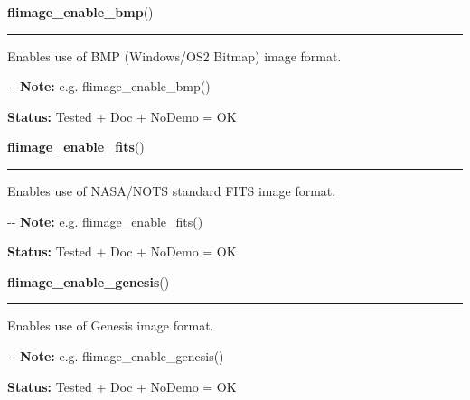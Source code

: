 \hspace{.8\funcindent}\begin{boxedminipage}{\funcwidth}

    \raggedright \textbf{flimage\_enable\_bmp}()

    \vspace{-1.5ex}

    \rule{\textwidth}{0.5\fboxrule}
\setlength{\parskip}{2ex}

Enables use of BMP (Windows/OS2 Bitmap) image format.

-{}-
\setlength{\parskip}{1ex}
\textbf{Note:} 
e.g. flimage\_enable\_bmp()


\textbf{Status:} 
Tested + Doc + NoDemo = OK


    \end{boxedminipage}

    \label{xformslib:flflimage:flimage_enable_fits}

    \vspace{0.5ex}

\hspace{.8\funcindent}\begin{boxedminipage}{\funcwidth}

    \raggedright \textbf{flimage\_enable\_fits}()

    \vspace{-1.5ex}

    \rule{\textwidth}{0.5\fboxrule}
\setlength{\parskip}{2ex}

Enables use of NASA/NOTS standard FITS image format.

-{}-
\setlength{\parskip}{1ex}
\textbf{Note:} 
e.g. flimage\_enable\_fits()


\textbf{Status:} 
Tested + Doc + NoDemo = OK


    \end{boxedminipage}

    \label{xformslib:flflimage:flimage_enable_genesis}

    \vspace{0.5ex}

\hspace{.8\funcindent}\begin{boxedminipage}{\funcwidth}

    \raggedright \textbf{flimage\_enable\_genesis}()

    \vspace{-1.5ex}

    \rule{\textwidth}{0.5\fboxrule}
\setlength{\parskip}{2ex}

Enables use of Genesis image format.

-{}-
\setlength{\parskip}{1ex}
\textbf{Note:} 
e.g. flimage\_enable\_genesis()


\textbf{Status:} 
Tested + Doc + NoDemo = OK


    \end{boxedminipage}


